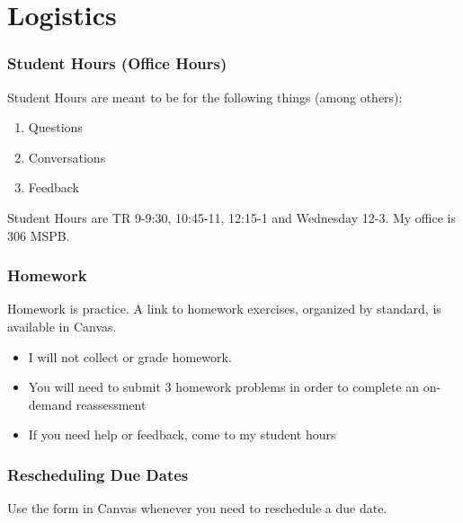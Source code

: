 \documentclass[aspectratio=1610]{beamer}
\begin{document}
\section{Logistics}

\begin{frame}\frametitle{Student Hours (Office Hours)}
Student Hours are meant to be for the following things (among others):
\begin{enumerate}
\item Questions
\item Conversations
\item Feedback
\end{enumerate}

\vspace{0.2in}

Student Hours are TR 9-9:30, 10:45-11, 12:15-1 and Wednesday 12-3. My office is 306 MSPB.
\end{frame}



\begin{frame}\frametitle{Homework}
Homework is practice.  A link to homework exercises, organized by standard, is available in Canvas.
\begin{itemize}
\item I will not collect or grade homework.
\item You will need to submit 3 homework problems in order to complete an on-demand reassessment
\item If you need help or feedback, come to my student hours 
\end{itemize}
\end{frame}



\begin{frame}\frametitle{Rescheduling Due Dates}

Use the form in Canvas whenever you need to reschedule a due date.

\end{frame}
\end{document}
